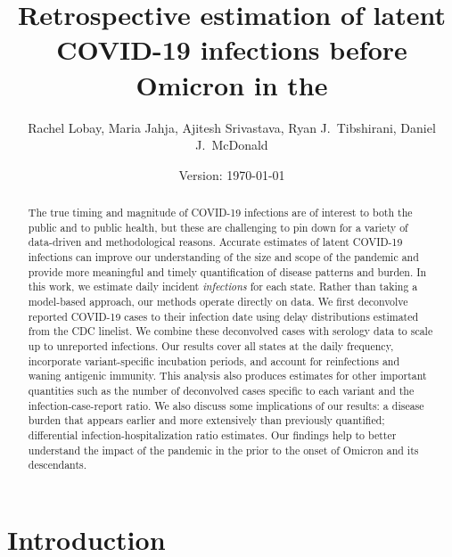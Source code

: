 \documentclass{article}
\begin{document}
\title{Retrospective estimation of latent COVID-19 infections before Omicron in the \US}
\author{Rachel Lobay, Maria Jahja, Ajitesh Srivastava, Ryan J.\ Tibshirani, Daniel J.\ McDonald}
\date{Version: \today}
\maketitle

\begin{abstract}
The true timing and magnitude of COVID-19 infections 
are of interest to both the public and to public health, but these are
challenging to pin down for a variety of data-driven and methodological reasons.
Accurate estimates of latent COVID-19 infections can improve our understanding
of the size and scope of the pandemic and provide more meaningful and timely
quantification of disease patterns and burden. In this work, we estimate daily
incident \emph{infections} for each \US state. Rather than taking a model-based
approach, our methods operate directly on data. We first deconvolve reported
COVID-19 cases to their infection date using delay distributions estimated from
the CDC linelist. We combine these deconvolved cases with serology data to scale
up to unreported infections. Our results cover all states at the daily
frequency, incorporate variant-specific incubation periods, and account for
reinfections and waning antigenic immunity. This analysis also produces
estimates for other important quantities such as the number of deconvolved cases
specific to each variant and the infection-case-report ratio. We also discuss some
implications of our results: a disease burden that appears earlier and more
extensively than previously quantified; differential infection-hospitalization
ratio estimates. Our findings help to better understand the impact of the
pandemic in the \US prior to the onset of Omicron and its descendants. 

\end{abstract}

\section{Introduction}
\end{document}
